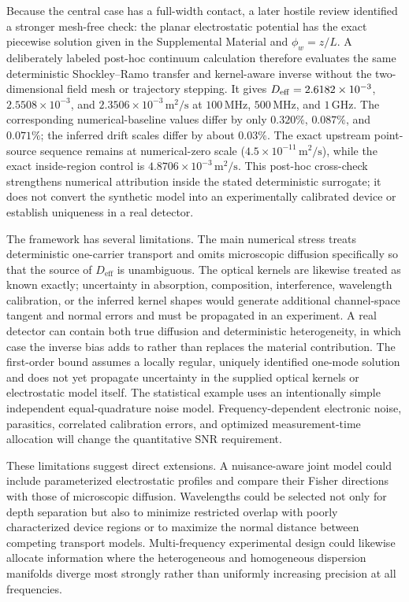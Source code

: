 \documentclass[aps,pra,twocolumn,superscriptaddress,nofootinbib]{revtex4-2}
\newcommand{\Deff}{D_{\mathrm{eff}}}
\begin{document}
Because the central case has a full-width contact, a later hostile review identified a stronger mesh-free check: the planar electrostatic potential has the exact piecewise solution given in the Supplemental Material and $\phi_w=z/L$.  A deliberately labeled post-hoc continuum calculation therefore evaluates the same deterministic Shockley--Ramo transfer and kernel-aware inverse without the two-dimensional field mesh or trajectory stepping.  It gives $D_{\rm eff}=2.6182\times10^{-3}$, $2.5508\times10^{-3}$, and $2.3506\times10^{-3}\,\mathrm{m^2/s}$ at $100\,\mathrm{MHz}$, $500\,\mathrm{MHz}$, and $1\,\mathrm{GHz}$.  The corresponding numerical-baseline values differ by only $0.320\%$, $0.087\%$, and $0.071\%$; the inferred drift scales differ by about $0.03\%$.  The exact upstream point-source sequence remains at numerical-zero scale ($4.5\times10^{-11}\,\mathrm{m^2/s}$), while the exact inside-region control is $4.8706\times10^{-3}\,\mathrm{m^2/s}$.  This post-hoc cross-check strengthens numerical attribution inside the stated deterministic surrogate; it does not convert the synthetic model into an experimentally calibrated device or establish uniqueness in a real detector.

The framework has several limitations. The main numerical stress treats deterministic one-carrier transport and omits microscopic diffusion specifically so that the source of $\Deff$ is unambiguous.  The optical kernels are likewise treated as known exactly; uncertainty in absorption, composition, interference, wavelength calibration, or the inferred kernel shapes would generate additional channel-space tangent and normal errors and must be propagated in an experiment. A real detector can contain both true diffusion and deterministic heterogeneity, in which case the inverse bias adds to rather than replaces the material contribution. The first-order bound assumes a locally regular, uniquely identified one-mode solution and does not yet propagate uncertainty in the supplied optical kernels or electrostatic model itself. The statistical example uses an intentionally simple independent equal-quadrature noise model. Frequency-dependent electronic noise, parasitics, correlated calibration errors, and optimized measurement-time allocation will change the quantitative SNR requirement.

These limitations suggest direct extensions. A nuisance-aware joint model could include parameterized electrostatic profiles and compare their Fisher directions with those of microscopic diffusion. Wavelengths could be selected not only for depth separation but also to minimize restricted overlap with poorly characterized device regions or to maximize the normal distance between competing transport models. Multi-frequency experimental design could likewise allocate information where the heterogeneous and homogeneous dispersion manifolds diverge most strongly rather than uniformly increasing precision at all frequencies.
\end{document}
